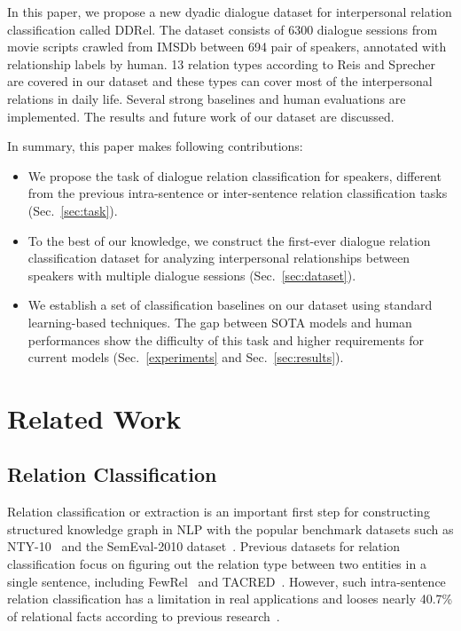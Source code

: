 \documentclass[letterpaper]{article} \usepackage{aaai21}  \usepackage{times}  \usepackage{helvet} \usepackage{courier}  \usepackage[hyphens]{url}  \usepackage{graphicx} \usepackage{xcolor}
\begin{document}
In this paper, we propose a new dyadic dialogue dataset for 
interpersonal relation classification called DDRel. 
The dataset consists of 6300 dialogue sessions from movie scripts crawled 
from IMSDb between 694 pair of speakers, annotated with relationship labels 
by human. 13 relation types according to 
Reis and Sprecher~\cite{reis2009encyclopedia} are covered in our dataset and these types can cover most of the interpersonal relations in daily life. 
Several strong baselines and human evaluations are implemented. 
The results and future work of our dataset are discussed.

In summary, this paper makes following contributions:
\begin{itemize}
	\item We propose the task of dialogue relation classification for speakers, different from the previous intra-sentence or inter-sentence relation classification tasks (Sec.~\ref{sec:task}).
	\item To the best of our knowledge, we construct the first-ever dialogue relation classification dataset for analyzing interpersonal relationships between speakers with multiple dialogue sessions (Sec.~\ref{sec:dataset}). \item We establish a set of classification baselines on our dataset using standard learning-based techniques. The gap between SOTA models and human performances show the difficulty of this task and higher requirements for current models (Sec.~\ref{experiments} and Sec.~\ref{sec:results}).
\end{itemize}
 
\section{Related Work}

\subsection{Relation Classification}
Relation classification or extraction is an important first step for constructing structured knowledge graph in NLP with the popular benchmark datasets such as NTY-10~\cite{RiedelYM10} and the SemEval-2010 dataset~\cite{HendrickxKKNSPP10}. Previous datasets for relation classification focus on figuring out the relation type between two entities in a single sentence, including FewRel~\cite{HanZYWYLS18} and  TACRED~\cite{ZhangZCAM17}.  However, such intra-sentence relation classification has a limitation in real applications and looses nearly 40.7\% of relational facts according to previous research~\cite{SwampillaiS10,VergaSM18,YaoYLHLLLHZS19}.
\end{document}
